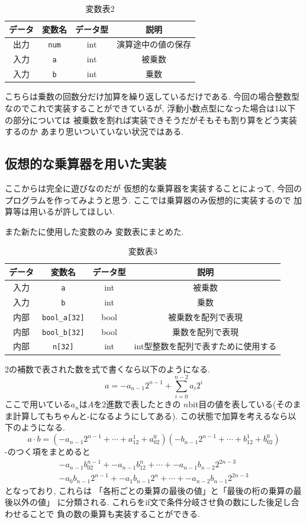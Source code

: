 \documentclass[a4paper, xelatex, ja=standard]{bxjsarticle}
\begin{document}
\begin{table}[h]
\centering
\caption{変数表2}
\label{}
\begin{tabular}{|c|c|c|c|}
\hline
データ & 変数名 & データ型 & 説明  \\ \hline
出力 & \texttt{num} & int  & 演算途中の値の保存 \\ \hline
入力 & \texttt{a} & int  & 被乗数 \\ \hline
入力 & \texttt{b} & int  & 乗数  \\ \hline
\end{tabular}
\end{table}
こちらは乗数の回数分だけ加算を繰り返しているだけである.
今回の場合整数型なのでこれで実装することができているが,
浮動小数点型になった場合は1以下の部分については
被乗数を割れば実装できそうだがそもそも割り算をどう実装するのか
あまり思いついていない状況ではある.

\subsection{仮想的な乗算器を用いた実装}
ここからは完全に遊びなのだが
仮想的な乗算器を実装することによって,
今回のプログラムを作ってみようと思う.
ここでは乗算器のみ仮想的に実装するので
加算等は用いるが許してほしい.

また新たに使用した変数のみ
変数表にまとめた.
\begin{table}[h]
\centering
\caption{変数表3}
\label{}
\begin{tabular}{|c|c|c|c|}
\hline
データ & 変数名 & データ型 & 説明  \\ \hline
入力 & \texttt{a} & int  & 被乗数 \\ \hline
入力 & \texttt{b} & int  & 乗数  \\ \hline
内部 & \texttt{bool\_a[32]} & bool  & 被乗数を配列で表現  \\ \hline
内部 & \texttt{bool\_b[32]} & bool  & 乗数を配列で表現  \\ \hline
内部 & \texttt{n[32]} & int  & int型整数を配列で表すために使用する  \\ \hline
\end{tabular}
\end{table}

2の補数で表された数を式で書くなら以下のようになる.
\[
a = -a_{n-1}2^{n-1}+\sum_{i=0}^{n-2}a_i2^i
\]
ここで用いている$a_n$は$A$を2進数で表したときの
$n$bit目の値を表している(そのまま計算してもちゃんと-になるようにしてある).
この状態で加算を考えるなら以下のようになる.
\[
a \cdot b=(-a_{n-1}2^{n-1}+\cdots+a_12^1+a_02^0)(-b_{n-1}2^{n-1}+\cdots+b_12^1+b_02^0)
\]
-のつく項をまとめると
\begin{align*}
-a_{n-1}b_02^{n-1}+-a_{n-1}b_12^{n}+\cdots+-a_{n-1}b_{n-2}2^{2n-3} \\
-a_0b_{n-1}2^{n-1}+-a_1b_{n-1}2^{n}+\cdots+-a_{n-2}b_{n-1}2^{2n-3}
\end{align*}
となっており, これらは
「各桁ごとの乗算の最後の値」と「最後の桁の乗算の最後以外の値」
に分類される.
これらをif文で条件分岐させ負の数にした後足し合わせることで
負の数の乗算も実装することができる.
\end{document}
